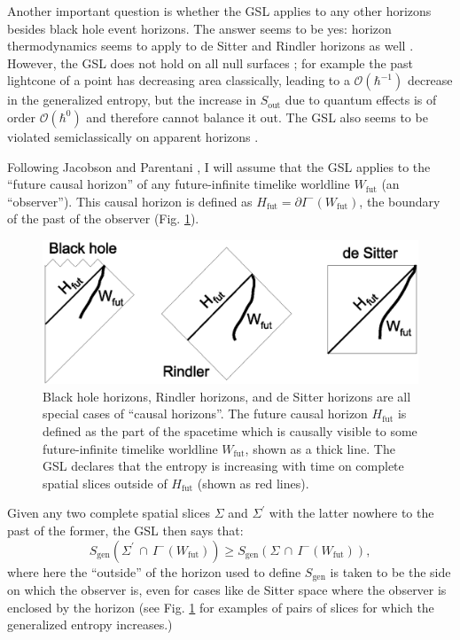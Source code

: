 \documentclass[12pt]{article}
\begin{document}
Another important question is whether the GSL applies to any other horizons besides black hole event horizons.  The answer seems to be yes: horizon thermodynamics seems to apply to de Sitter and Rindler horizons as well \cite{JP, myproofs}.  However, the GSL does not hold on all null surfaces \cite{10proofs}; for example the past lightcone of a point has decreasing area classically, leading to a $\mathcal{O}(\hbar^{-1})$ decrease in the generalized entropy, but the increase in $S_\mathrm{out}$ due to quantum effects is of order $\mathcal{O}(\hbar^{0})$ and therefore cannot balance it out.  The GSL also seems to be violated semiclassically on apparent horizons \cite{FPSTap}.

Following Jacobson and Parentani \cite{JP}, I will assume that the GSL applies to the ``future causal horizon'' of any future-infinite timelike worldline $W_\mathrm{fut}$ (an ``observer'').  This causal horizon is defined as $H_\mathrm{fut} = \partial I^-(W_\mathrm{fut})$, the boundary of the past of the observer (Fig. \ref{Wfut}).

\begin{figure}[hbt]
\centering
\includegraphics[width=.75\textwidth]{Wfut.eps}
\caption{\small{Black hole horizons, Rindler horizons, and de Sitter horizons are all special cases of ``causal horizons''.  The future causal horizon $H_\mathrm{fut}$ is defined as the part of the spacetime which is causally visible to some future-infinite timelike worldline $W_\mathrm{fut}$, shown as a thick line.  The GSL declares that the entropy is increasing with time on complete spatial slices outside of $H_\mathrm{fut}$ (shown as red lines).
}}\label{Wfut}
\end{figure}

Given any two complete spatial slices $\Sigma$ and $\Sigma^\prime$ with the latter nowhere to the past of the former, the GSL then says that:
\begin{equation}
S_{\mathrm{gen}}(\Sigma^\prime\,\cap\,I^-(W_\mathrm{fut})) \ge S_{\mathrm{gen}}(\Sigma\,\cap\,I^-(W_\mathrm{fut})),
\end{equation}
where here the ``outside'' of the horizon used to define $S_{\mathrm{gen}}$ is taken to be the  side on which the observer is, even for cases like de Sitter space where the observer is enclosed by the horizon (see Fig. \ref{Wfut} for examples of pairs of  slices for which the generalized entropy increases.)
\end{document}

